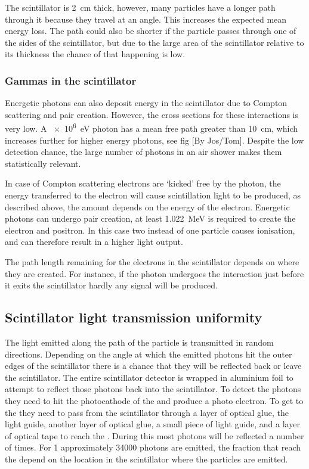 The scintillator is \SI{2}{\centi\meter} thick, however, many particles have a longer path through it because they travel at an angle. This increases the expected mean energy loss. The path could also be shorter if the particle passes through one of the sides of the scintillator, but due to the large area of the scintillator relative to its thickness the chance of that happening is low.


\subsubsection{Gammas in the scintillator}

Energetic photons can also deposit energy in the scintillator due to Compton scattering and pair creation. However, the cross sections for these interactions is very low. A \SI{e6}{\eV} photon has a mean free path greater than \SI{10}{\centi\meter}, which increases further for higher energy photons, see fig [By Jos/Tom]. Despite the low detection chance, the large number of photons in an air shower makes them statistically relevant.

In case of Compton scattering electrons are `kicked' free by the photon, the energy transferred to the electron will cause scintillation light to be produced, as described above, the amount depends on the energy of the electron. Energetic photons can undergo pair creation, at least \SI{1.022}{\MeV} is required to create the electron and positron. In this case two instead of one particle causes ionisation, and can therefore result in a higher light output.

The path length remaining for the electrons in the scintillator depends on where they are created. For instance, if the photon undergoes the interaction just before it exits the scintillator hardly any signal will be produced.


\subsection{Scintillator light transmission uniformity}

The light emitted along the path of the particle is transmitted in random directions. Depending on the angle at which the emitted photons hit the outer edges of the scintillator there is a chance that they will be reflected back or leave the scintillator. The entire scintillator detector is wrapped in aluminium foil to attempt to reflect those photons back into the scintillator. To detect the photons they need to hit the photocathode of the \pmt and produce a photo electron. To get to the \pmt they need to pass from the scintillator through a layer of optical glue, the light guide, another layer of optical glue, a small piece of light guide, and a layer of optical tape to reach the \pmt. During this most photons will be reflected a number of times. For \SI{1}{\mip} approximately \num{34000} photons \cite[sec. 3.1]{lio2010} are emitted, the fraction that reach the \pmt depend on the location in the scintillator where the particles are emitted.

